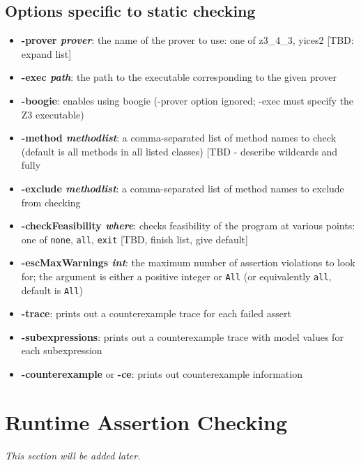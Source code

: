 \subsection{Options specific to static checking}
\begin{itemize}[noitemsep,nolistsep]
\item \textbf{-prover \textit{prover}}: the name of the prover to use: one of z3\_4\_3, yices2 [TBD: expand list]
\item \textbf{-exec \textit{path}}: the path to the executable corresponding to the given prover
\item \textbf{-boogie}: enables using boogie (-prover option ignored; -exec must specify the Z3 executable)
\item \textbf{-method \textit{methodlist}}: a comma-separated list of method names to check (default is all methods in all listed classes) [TBD - describe wildcards and fully 
\item \textbf{-exclude \textit{methodlist}}: a comma-separated list of method names to exclude from checking
\item \textbf{-checkFeasibility \textit{where}}: checks feasibility of the program at various points:
one of \texttt{none}, \texttt{all}, \texttt{exit} [TBD, finish list, give default]
\item \textbf{-escMaxWarnings \textit{int}}: the maximum number of assertion violations to look for; the argument is either a positive integer or \texttt{All} (or equivalently \texttt{all}, default is \texttt{All})
\item \textbf{-trace}: prints out a counterexample trace for each failed assert
\item \textbf{-subexpressions}: prints out a counterexample trace with model values for each subexpression
\item \textbf{-counterexample} or \textbf{-ce}: prints out counterexample information
\end{itemize}

\section{Runtime Assertion Checking}
\textit{This section will be added later.} %

